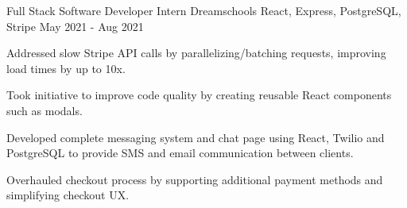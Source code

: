 \begin{cventries}
  \cventry
    {Full Stack Software Developer Intern} %
    {Dreamschools} %
    {React, Express, PostgreSQL, Stripe} %
    {May 2021 - Aug 2021} %
    {
      \begin{cvitems} %
        \item {Addressed slow Stripe API calls by parallelizing/batching requests, improving load times by up to 10x.}
        \item {Took initiative to improve code quality by creating reusable React components such as modals.}
        \item {Developed complete messaging system and chat page using React, Twilio and PostgreSQL to provide SMS and email communication between clients.}
        \item {Overhauled checkout process by supporting additional payment methods and simplifying checkout UX.}
      \end{cvitems}
    }
\end{cventries}
